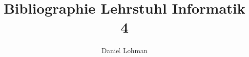 \documentclass[11pt,dvips]{article}
\begin{document}
\title{
    Bibliographie Lehrstuhl Informatik 4
}

\author{Daniel Lohman}

\maketitle

\nocite{*}

\end{document}
